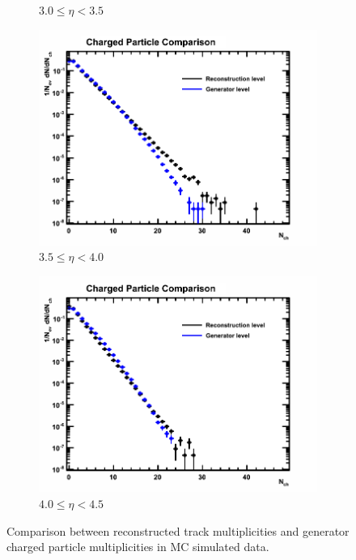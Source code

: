 \begin{figure}[h]
\begin{subfigure}[h]{0.32\textwidth}
		\caption{$3.0 \le \eta < 3.5$}
		\label{fig: reconstructed track multiplicity mc down 3.0 - 3.5}
	\end{subfigure}
	\begin{subfigure}[h]{0.32\textwidth}
		\includegraphics[width=\textwidth]{./Chapters/multiplicity/charged_particle_event_multiplicity/images/reco_gen_comparison/3_5-4_0.png}
		\caption{$3.5 \le \eta < 4.0$}
		\label{fig: reconstructed track multiplicity mc down 3.5 - 4.0}
	\end{subfigure}
	\begin{subfigure}[h]{0.32\textwidth}
		\includegraphics[width=\textwidth]{./Chapters/multiplicity/charged_particle_event_multiplicity/images/reco_gen_comparison/4_0-4_5.png}
		\caption{$4.0 \le \eta < 4.5$}
		\label{fig: reconstructed track multiplicity mc down 4.0 - 4.5}
	\end{subfigure}
	\caption{Comparison between reconstructed track multiplicities and generator charged particle multiplicities in MC simulated data.}
	\label{fig: reconstructed track multiplicity mc down}
\end{figure}


